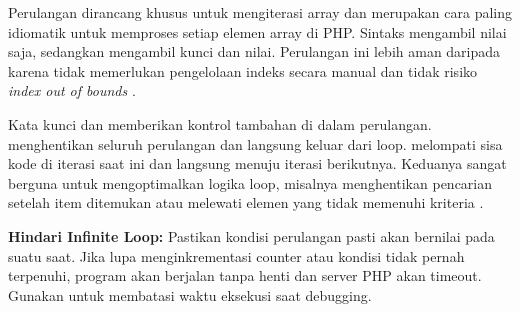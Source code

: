 
Perulangan  dirancang khusus untuk mengiterasi array dan merupakan cara paling idiomatik untuk memproses setiap elemen array di PHP. Sintaks  mengambil nilai saja, sedangkan  mengambil kunci dan nilai. Perulangan ini lebih aman daripada  karena tidak memerlukan pengelolaan indeks secara manual dan tidak risiko \textit{index out of bounds} \cite{phpManual}.


Kata kunci  dan  memberikan kontrol tambahan di dalam perulangan.  menghentikan seluruh perulangan dan langsung keluar dari loop.  melompati sisa kode di iterasi saat ini dan langsung menuju iterasi berikutnya. Keduanya sangat berguna untuk mengoptimalkan logika loop, misalnya menghentikan pencarian setelah item ditemukan atau melewati elemen yang tidak memenuhi kriteria \cite{phpRightWay}.

\begin{catatan}
\textbf{Hindari Infinite Loop:} Pastikan kondisi perulangan pasti akan bernilai  pada suatu saat. Jika lupa menginkrementasi counter atau kondisi tidak pernah terpenuhi, program akan berjalan tanpa henti dan server PHP akan timeout. Gunakan  untuk membatasi waktu eksekusi saat debugging.
\end{catatan}

